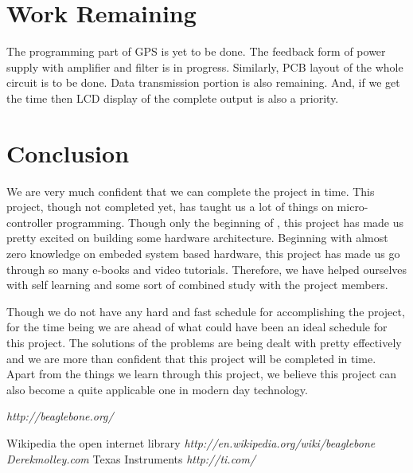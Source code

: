 \documentclass[11pt,a4paper]{article}
\begin{document}
\section{Work Remaining}
The programming part of GPS is yet to be done. The feedback form of power supply with amplifier and filter is in progress. Similarly, PCB layout of the whole circuit is to be done. Data transmission portion is also remaining. And, if we get the time then LCD display of the complete output is also a priority.

\section{Conclusion}
We are very much confident that we can complete the project in time. This project, though not completed yet, has taught us a lot of things on micro-controller programming. Though only the beginning of , this project has made us pretty excited on building some hardware architecture. Beginning with almost zero knowledge on embeded system based hardware, this project has made us go through so many e-books and video tutorials. Therefore, we have helped ourselves with self learning and some sort of combined study with the project members.


Though we do not have any hard and fast schedule for accomplishing the project, for the time being we are ahead of what could have been an ideal schedule for this project. The solutions of the problems are being dealt with pretty effectively and we are more than confident that this project will be completed in time.
Apart from the things we learn through this project, we believe this project can also become a quite applicable one in modern day technology. 

\begin{thebibliography}{99}
\bibitem{} \textit{http://beaglebone.org/}

\bibitem{} Wikipedia the open internet library \emph{http://en.wikipedia.org/wiki/beaglebone}
\bibitem{} \emph{Derekmolley.com}
\bibitem{} Texas Instruments \emph{http://ti.com/}
\end{thebibliography}
\end{document}
